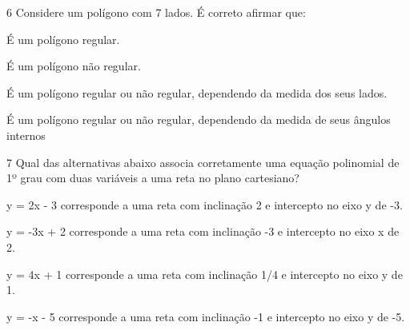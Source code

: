



\num{6} Considere um polígono com 7 lados. É correto afirmar que:
\item É um polígono regular.
\item É um polígono não regular.
\item É um polígono regular ou não regular, dependendo da medida dos seus
lados.
\item É um polígono regular ou não regular, dependendo da medida de seus
ângulos internos







\num{7} Qual das alternativas abaixo associa corretamente uma equação
polinomial de 1º grau com duas variáveis a uma reta no plano cartesiano?
\item y = 2x - 3 corresponde a uma reta com inclinação 2 e intercepto no
eixo y de -3.
\item y = -3x + 2 corresponde a uma reta com inclinação -3 e intercepto no
eixo x de 2.
\item y = 4x + 1 corresponde a uma reta com inclinação 1/4 e intercepto no
eixo y de 1.
\item y = -x - 5 corresponde a uma reta com inclinação -1 e intercepto no
eixo y de -5.

